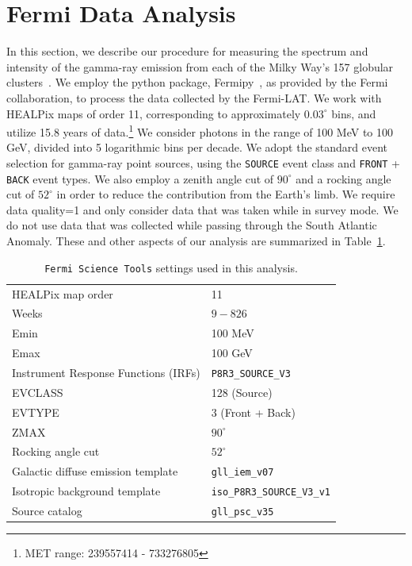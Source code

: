 \section{Fermi Data Analysis}
\label{sec:fermi-data-analysis}


In this section, we describe our procedure for measuring the spectrum and intensity of the gamma-ray emission from each of the Milky Way's 157 globular clusters~\cite{harris2010newcatalogglobularclusters}.
We employ the python package, Fermipy~\cite{wood2017fermipyopensourcepythonpackage}, as provided by the Fermi collaboration, to process the data collected by the Fermi-LAT. 
We work with HEALPix maps of order 11, corresponding to approximately $0.03^{\circ}$ bins, and utilize 15.8 years of data.\footnote{MET range:  239557414 - 733276805} We consider photons in the range of 100 MeV to 100 GeV, divided into 5 logarithmic bins per decade. We adopt the standard event selection for gamma-ray point sources, using the \verb|SOURCE| event class and \verb|FRONT| + \verb|BACK| event types. We also employ a zenith angle cut of $90^{\circ}$ and a rocking angle cut of $52^{\circ}$ in order to reduce the contribution from the Earth's limb. We require data quality=1 and only consider data that was taken while in survey mode. We do not use data that was collected while passing through the South Atlantic Anomaly. These and other aspects of our analysis are summarized in Table~\ref{tab:msp:settings}.

\begin{table}[t]
\centering
\begin{tabular}{ | l| l|  }
\hline
HEALPix map order& 11  \\ 
Weeks & $9-826$  \\ 
Emin & 100 MeV \\
Emax & 100 GeV \\
Instrument Response Functions (IRFs) & \verb|P8R3_SOURCE_V3| \\
EVCLASS & 128 (Source)  \\ 
EVTYPE & 3 (Front + Back)  \\
ZMAX & $90^{\circ}$ \\
Rocking angle cut & $52^{\circ}$ \\
Galactic diffuse emission template & \verb|gll_iem_v07| \\
Isotropic background template & \verb|iso_P8R3_SOURCE_V3_v1| \\
Source catalog & \verb|gll_psc_v35| \\ 
\hline
\end{tabular}
\caption{\texttt{Fermi Science Tools} settings used in this analysis. }
\label{tab:msp:settings}
\end{table}


